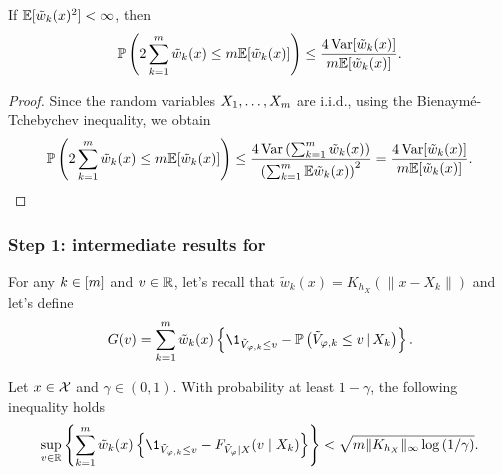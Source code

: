 \begin{lemma}\label{lem:bound:concentration-Sum-wk}
    If $\mathbb{E}[\tilde{w}_k(x)^2]<\infty$, then 
    \begin{equation*}\label{eq:tmh:step2:bound:5}
      \mathbb{P}\left({2\sum_{k=1}^{m} \tilde{w}_{k}(x) \le m \mathbb{E}[\tilde{w}_k(x)]}\right)
      \le \frac{4 \operatorname{Var}[\tilde{w}_k(x)]}{m \mathbb{E}[\tilde{w}_k(x)]}.
    \end{equation*}
\end{lemma}

\begin{proof}
  Since the random variables $X_1,\ldots,X_{m}$ are i.i.d., using the Bienaymé-Tchebychev inequality, we obtain
  \begin{equation*}
    \mathbb{P}\left({2\sum_{k=1}^{m} \tilde{w}_{k}(x) \le m \mathbb{E}[\tilde{w}_k(x)]}\right)
    \le \frac{4 \operatorname{Var}\left({{\sum_{k=1}^{m} \tilde{w}_{k}(x)}}\right)}{\left({\sum_{k=1}^{m} \mathbb{E} \tilde{w}_{k}(x)}\right)^2}
    = \frac{4 \operatorname{Var}[\tilde{w}_k(x)]}{m \mathbb{E}[\tilde{w}_k(x)]}.
  \end{equation*}
\end{proof}

\subsubsection{Step 1: intermediate results for }

For any $k\in[m]$ and $v\in\mathbb{R}$, let's recall that $\tilde{w}_{k}(x) = K_{h_{X}}(\|x-X_{k}\|)$ and let's define
\begin{equation}\label{eq:def:Gv}
  G(v)
  = \sum_{k=1}^{\ccount} \tilde{w}_{k}(x) \ac{ \1_{\tilde{V}_{\varphi,k}\le v} - \prob\pr{\tilde{V}_{\varphi,k}\le v \,\vert\, X_{k}}}.
\end{equation}

  \begin{theorem}\label{thm:step1}
    Let $x\in\mathcal{X}$ and $\gamma\in(0,1)$.
    With probability at least $1-\gamma$, the following inequality holds
    \begin{equation*}
      \sup_{v\in\R} \ac{ \sum_{k=1}^{\ccount} \tilde{w}_{k}(x) \ac{ \1_{\tilde{V}_{\varphi,k}\le v} -  F_{\tilde{V}_{\varphi}\mid X}(v\mid X_{k})} } < \sqrt{ \ccount \normn{K_{h_{X}}}_{\infty} \log \pr{\nofrac{1}{\gamma}}}.
    \end{equation*}
  \end{theorem}

